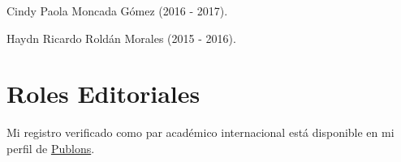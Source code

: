\documentclass[11pt, a4paper]{awesome-cv}
\begin{document}
\begin{cventries}
{\begin{cvitems}
\item Cindy Paola Moncada Gómez (2016 - 2017).
\item Haydn Ricardo Roldán Morales (2015 - 2016).
\end{cvitems}}
\end{cventries}

\hypertarget{roles-editoriales}{%
\section{Roles Editoriales}\label{roles-editoriales}}

Mi registro verificado como par académico internacional está disponible
en mi perfil de
\href{https://publons.com/researcher/1333339/juan-david-leongomez/}{Publons}.
\end{document}

